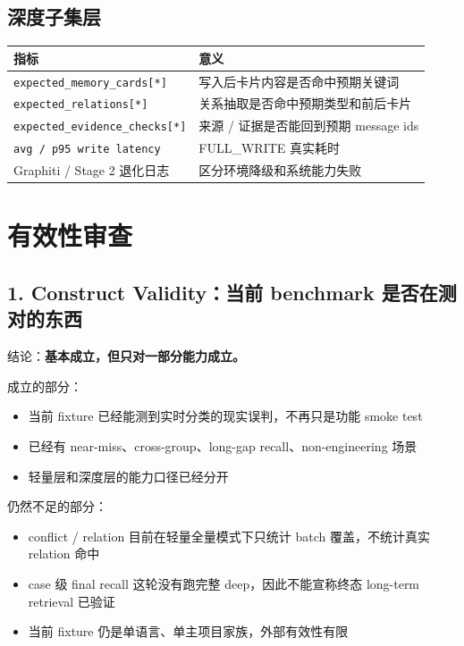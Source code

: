 \documentclass[11pt]{article}
\begin{document}
\subsection{深度子集层}

\begin{tabularx}{\textwidth}{@{}lX@{}}
\toprule
\textbf{指标} & \textbf{意义} \\
\midrule
\texttt{expected\_memory\_cards[*]} & 写入后卡片内容是否命中预期关键词 \\
\texttt{expected\_relations[*]} & 关系抽取是否命中预期类型和前后卡片 \\
\texttt{expected\_evidence\_checks[*]} & 来源 / 证据是否能回到预期 message ids \\
\texttt{avg / p95 write latency} & FULL\_WRITE 真实耗时 \\
Graphiti / Stage 2 退化日志 & 区分环境降级和系统能力失败 \\
\bottomrule
\end{tabularx}

\section{有效性审查}

\subsection{1. Construct Validity：当前 benchmark 是否在测对的东西}

结论：\textbf{基本成立，但只对一部分能力成立。}

成立的部分：
\begin{itemize}
\item 当前 fixture 已经能测到实时分类的现实误判，不再只是功能 smoke test
\item 已经有 near-miss、cross-group、long-gap recall、non-engineering 场景
\item 轻量层和深度层的能力口径已经分开
\end{itemize}

仍然不足的部分：
\begin{itemize}
\item conflict / relation 目前在轻量全量模式下只统计 batch 覆盖，不统计真实 relation 命中
\item case 级 final recall 这轮没有跑完整 deep，因此不能宣称终态 long-term retrieval 已验证
\item 当前 fixture 仍是单语言、单主项目家族，外部有效性有限
\end{itemize}
\end{document}

